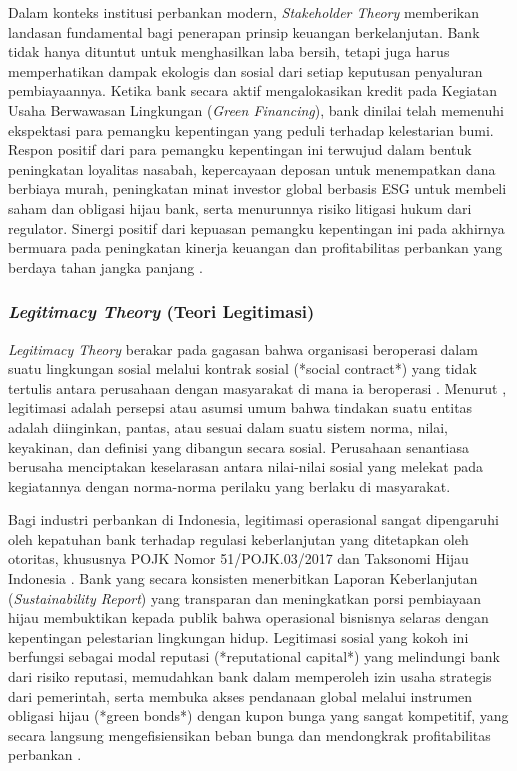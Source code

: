 \documentclass[12pt,a4paper]{article}
\numberwithin{equation}{section}
\begin{document}
\noindent
Dalam konteks institusi perbankan modern, \emph{Stakeholder Theory} memberikan landasan fundamental bagi penerapan prinsip keuangan berkelanjutan. Bank tidak hanya dituntut untuk menghasilkan laba bersih, tetapi juga harus memperhatikan dampak ekologis dan sosial dari setiap keputusan penyaluran pembiayaannya. Ketika bank secara aktif mengalokasikan kredit pada Kegiatan Usaha Berwawasan Lingkungan (\emph{Green Financing}), bank dinilai telah memenuhi ekspektasi para pemangku kepentingan yang peduli terhadap kelestarian bumi. Respon positif dari para pemangku kepentingan ini terwujud dalam bentuk peningkatan loyalitas nasabah, kepercayaan deposan untuk menempatkan dana berbiaya murah, peningkatan minat investor global berbasis ESG untuk membeli saham dan obligasi hijau bank, serta menurunnya risiko litigasi hukum dari regulator. Sinergi positif dari kepuasan pemangku kepentingan ini pada akhirnya bermuara pada peningkatan kinerja keuangan dan profitabilitas perbankan yang berdaya tahan jangka panjang \citep{Buallay2019, Pramono2022}.

\subsubsection{\emph{Legitimacy Theory} (Teori Legitimasi)}
\noindent
\emph{Legitimacy Theory} berakar pada gagasan bahwa organisasi beroperasi dalam suatu lingkungan sosial melalui kontrak sosial (*social contract*) yang tidak tertulis antara perusahaan dengan masyarakat di mana ia beroperasi \citep{Suchman1995, Deegan2002}. Menurut \citet{Suchman1995}, legitimasi adalah persepsi atau asumsi umum bahwa tindakan suatu entitas adalah diinginkan, pantas, atau sesuai dalam suatu sistem norma, nilai, keyakinan, dan definisi yang dibangun secara sosial. Perusahaan senantiasa berusaha menciptakan keselarasan antara nilai-nilai sosial yang melekat pada kegiatannya dengan norma-norma perilaku yang berlaku di masyarakat.

\noindent
Bagi industri perbankan di Indonesia, legitimasi operasional sangat dipengaruhi oleh kepatuhan bank terhadap regulasi keberlanjutan yang ditetapkan oleh otoritas, khususnya POJK Nomor 51/POJK.03/2017 dan Taksonomi Hijau Indonesia \citep{OJK2017, OJK2022}. Bank yang secara konsisten menerbitkan Laporan Keberlanjutan (\emph{Sustainability Report}) yang transparan dan meningkatkan porsi pembiayaan hijau membuktikan kepada publik bahwa operasional bisnisnya selaras dengan kepentingan pelestarian lingkungan hidup. Legitimasi sosial yang kokoh ini berfungsi sebagai modal reputasi (*reputational capital*) yang melindungi bank dari risiko reputasi, memudahkan bank dalam memperoleh izin usaha strategis dari pemerintah, serta membuka akses pendanaan global melalui instrumen obligasi hijau (*green bonds*) dengan kupon bunga yang sangat kompetitif, yang secara langsung mengefisiensikan beban bunga dan mendongkrak profitabilitas perbankan \citep{Zhou2021, FitrianiWardani2024}.
\end{document}
